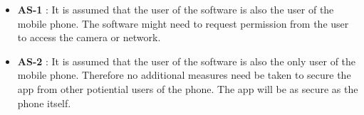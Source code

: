                     \noindent
                    \begin{itemize}[leftmargin=*]
                        \item[]  \textbf{AS-1} : It is assumed that the user of the software is also the user of the mobile phone. The software might need to request permission from the user to access the camera or network.

                    \end{itemize}

                    \noindent
                    \begin{itemize}[leftmargin=*]
                        \item[]  \textbf{AS-2} : It is assumed that the user of the software is also the only user of the mobile phone. Therefore no additional measures need be taken to secure the app from other potiential users of the phone. The app will be as secure as the phone itself.

                    \end{itemize}